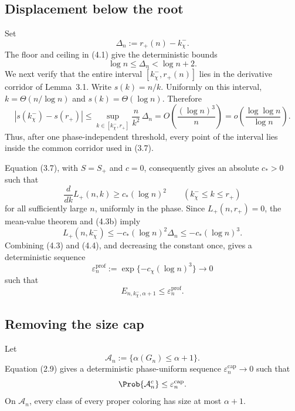 \subsection*{Displacement below the root}

Set
\[
  \Delta_n:=r_+(n)-k_\chi^-.
\]
The floor and ceiling in (4.1) give the deterministic bounds
\begin{equation*}
  \log n\le\Delta_n<\log n+2.
  \tag{4.3b}
\end{equation*}
We next verify that the entire interval
$[k_\chi^-,r_+(n)]$ lies in the derivative corridor of Lemma~3.1. Write
$s(k)=n/k$. Uniformly on this interval,
$k=\Theta(n/\log n)$ and $s(k)=\Theta(\log n)$. Therefore
\[
  |s(k_\chi^-)-s(r_+)|
  \le
  \sup_{k\in[k_\chi^-,r_+]}
  \frac{n}{k^2}\,\Delta_n
  =O\!\left(\frac{(\log n)^3}{n}\right)
  =o\!\left(\frac{\log\log n}{\log n}\right).
\]
Thus, after one phase-independent threshold, every point of the interval lies
inside the common corridor used in (3.7).

Equation (3.7), with $S=S_+$ and $c=0$, consequently gives an absolute
$c_*>0$ such that
\begin{equation*}
  \frac{d}{dk}L_+(n,k)\ge c_*(\log n)^2
  \qquad
  (k_\chi^-\le k\le r_+)
  \tag{4.3c}
\end{equation*}
for all sufficiently large $n$, uniformly in the phase. Since
$L_+(n,r_+)=0$, the mean-value theorem and (4.3b) imply
\begin{equation*}
  L_+(n,k_\chi^-)
  \le-c_*(\log n)^2\Delta_n
  \le-c_*(\log n)^3.
  \tag{4.4}
\end{equation*}
Combining (4.3) and (4.4), and decreasing the constant once, gives a
deterministic sequence
\[
  \varepsilon_n^{\mathrm{prof}}
  :=
  \exp\{-c_\chi(\log n)^3\}
  \longrightarrow0
\]
such that
\begin{equation*}
  E_{n,k_\chi^-,\alpha+1}
  \le\varepsilon_n^{\mathrm{prof}}.
  \tag{4.4a}
\end{equation*}

\subsection*{Removing the size cap}

Let
\[
  \mathcal A_n:=\{\alpha(G_n)\le\alpha+1\}.
\]
Equation (2.9) gives a deterministic phase-uniform sequence
$\varepsilon_n^{\mathrm{cap}}\to0$ such that
\[
  \Prob{\mathcal A_n^c}
  \le\varepsilon_n^{\mathrm{cap}}.
\]
On $\mathcal A_n$, every class of every proper coloring has size at most
$\alpha+1$.

